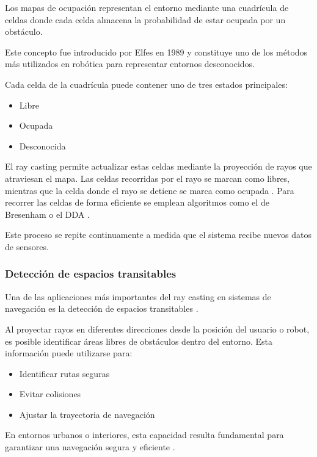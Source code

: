 Los mapas de ocupación representan el entorno mediante una cuadrícula de celdas donde cada celda almacena la probabilidad de estar ocupada por un obstáculo.

Este concepto fue introducido por Elfes en 1989 \cite{elfes1989} y constituye uno de los métodos más utilizados en robótica para representar entornos desconocidos.

Cada celda de la cuadrícula puede contener uno de tres estados principales:

\begin{itemize}
\item Libre
\item Ocupada
\item Desconocida
\end{itemize}

El ray casting permite actualizar estas celdas mediante la proyección de rayos que atraviesan el mapa. Las celdas recorridas por el rayo se marcan como libres, mientras que la celda donde el rayo se detiene se marca como ocupada \cite{elfes1989}. Para recorrer las celdas de forma eficiente se emplean algoritmos como el de Bresenham \cite{bresenham1965} o el DDA \cite{wikipedia_dda}.

Este proceso se repite continuamente a medida que el sistema recibe nuevos datos de sensores.

\subsubsection{Detección de espacios transitables}

Una de las aplicaciones más importantes del ray casting en sistemas de navegación es la detección de espacios transitables \cite{elfes1989}.

Al proyectar rayos en diferentes direcciones desde la posición del usuario o robot, es posible identificar áreas libres de obstáculos dentro del entorno. Esta información puede utilizarse para:

\begin{itemize}
\item Identificar rutas seguras
\item Evitar colisiones
\item Ajustar la trayectoria de navegación
\end{itemize}

En entornos urbanos o interiores, esta capacidad resulta fundamental para garantizar una navegación segura y eficiente \cite{wikipedia_slam}.

